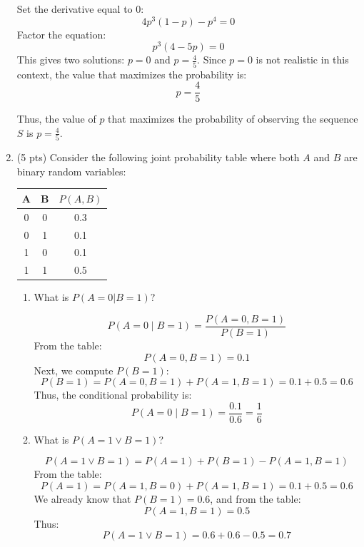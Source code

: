 \documentclass[letter]{article}
\theoremstyle{definition}
\newenvironment{soln}{
	\leavevmode\color{black}\ignorespaces
}{}
\begin{document}
\begin{enumerate}
\begin{soln}
            Set the derivative equal to 0:
            \[
            4p^3 (1 - p) - p^4 = 0
            \]
            Factor the equation:
            \[
            p^3 (4 - 5p) = 0
            \]
            This gives two solutions: $p = 0$ and $p = \frac{4}{5}$. Since $p = 0$ is not realistic in this context, the value that maximizes the probability is:
            \[
            p = \frac{4}{5}
            \]
            
            Thus, the value of $p$ that maximizes the probability of observing the sequence $S$ is $p = \frac{4}{5}$.
            \end{soln}
		
		\item 	(5 pts) Consider the following joint probability table where both $A$ and $B$ are binary random variables: 
		\begin{table}[htb]
			\centering
			\begin{tabular}{ccc}\hline
				A & B & $P(A, B)$  \\\hline
				0 & 0 & 0.3 \\
				0 & 1 & 0.1 \\
				1 & 0 & 0.1 \\
				1 & 1 & 0.5 \\\hline
			\end{tabular}
		\end{table}
		\begin{enumerate}
			\item 	What is $P(A = 0 | B = 1)$?\\
			\begin{soln}
                \[
                P(A = 0 \mid B = 1) = \frac{P(A = 0, B = 1)}{P(B = 1)}
                \]
                From the table:
                \[
                P(A = 0, B = 1) = 0.1
                \]
                Next, we compute $P(B = 1)$:
                \[
                P(B = 1) = P(A = 0, B = 1) + P(A = 1, B = 1) = 0.1 + 0.5 = 0.6
                \]
                Thus, the conditional probability is:
                \[
                P(A = 0 \mid B = 1) = \frac{0.1}{0.6} = \frac{1}{6}
                \]
                \end{soln}
			 
			\item 	What is $P(A = 1 \vee B = 1 )$?\\
		      \begin{soln}
                \[
                P(A = 1 \vee B = 1) = P(A = 1) + P(B = 1) - P(A = 1, B = 1)
                \]
                From the table:
                \[
                P(A = 1) = P(A = 1, B = 0) + P(A = 1, B = 1) = 0.1 + 0.5 = 0.6
                \]
                We already know that $P(B = 1) = 0.6$, and from the table:
                \[
                P(A = 1, B = 1) = 0.5
                \]
                Thus:
                \[
                P(A = 1 \vee B = 1) = 0.6 + 0.6 - 0.5 = 0.7
                \]
                \end{soln}
		\end{enumerate}
	\end{enumerate}
\end{document}
